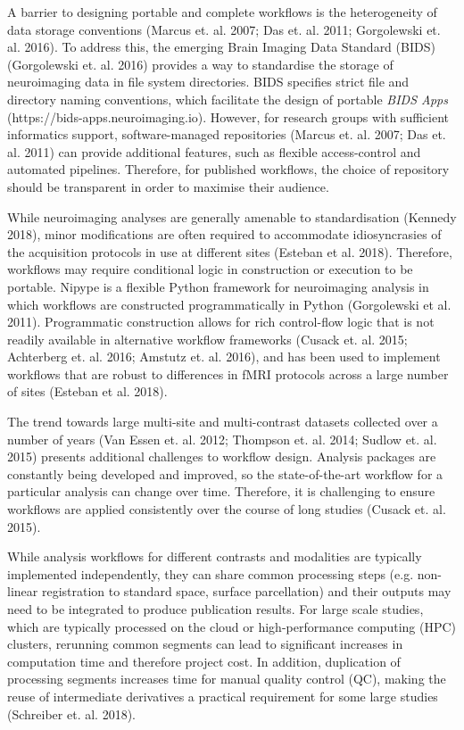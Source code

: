 A barrier to designing portable and complete workflows is the
heterogeneity of data storage conventions (Marcus et. al. 2007; Das et.
al. 2011; Gorgolewski et. al. 2016). To address this, the emerging Brain
Imaging Data Standard (BIDS) (Gorgolewski et. al. 2016) provides a way
to standardise the storage of neuroimaging data in file system
directories. BIDS specifies strict file and directory naming
conventions, which facilitate the design of portable \emph{BIDS Apps}
(https://bids-apps.neuroimaging.io). However, for research groups with
sufficient informatics support, software-managed repositories (Marcus
et. al. 2007; Das et. al. 2011) can provide additional features, such as
flexible access-control and automated pipelines. Therefore, for
published workflows, the choice of repository should be transparent in
order to maximise their audience.

While neuroimaging analyses are generally amenable to standardisation
(Kennedy 2018), minor modifications are often required to accommodate
idiosyncrasies of the acquisition protocols in use at different sites
(Esteban et al. 2018). Therefore, workflows may require conditional
logic in construction or execution to be portable. Nipype is a flexible
Python framework for neuroimaging analysis in which workflows are
constructed programmatically in Python (Gorgolewski et al. 2011).
Programmatic construction allows for rich control-flow logic that is not
readily available in alternative workflow frameworks (Cusack et. al.
2015; Achterberg et. al. 2016; Amstutz et. al. 2016), and has been used
to implement workflows that are robust to differences in fMRI protocols
across a large number of sites (Esteban et al. 2018).

The trend towards large multi-site and multi-contrast datasets collected
over a number of years (Van Essen et. al. 2012; Thompson et. al. 2014;
Sudlow et. al. 2015) presents additional challenges to workflow design.
Analysis packages are constantly being developed and improved, so the
state-of-the-art workflow for a particular analysis can change over
time. Therefore, it is challenging to ensure workflows are applied
consistently over the course of long studies (Cusack et. al. 2015).

While analysis workflows for different contrasts and modalities are
typically implemented independently, they can share common processing
steps (e.g. non-linear registration to standard space, surface
parcellation) and their outputs may need to be integrated to produce
publication results. For large scale studies, which are typically
processed on the cloud or high-performance computing (HPC) clusters,
rerunning common segments can lead to significant increases in
computation time and therefore project cost. In addition, duplication of
processing segments increases time for manual quality control (QC),
making the reuse of intermediate derivatives a practical requirement for
some large studies (Schreiber et. al. 2018).

